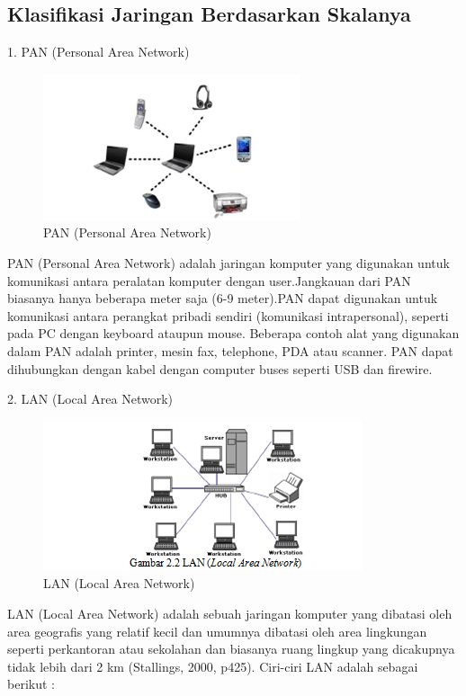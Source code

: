 \documentclass{jtetiproposalskripsi}
\begin{document}
\subsection{Klasifikasi Jaringan Berdasarkan Skalanya}
1. PAN (Personal Area Network)

\begin{figure}[ht!]
  \centering
    \includegraphics{gambar/pan}
    \caption{PAN (Personal Area Network)}
    \label{kripto}
\end{figure}
	PAN (Personal Area Network) adalah jaringan komputer yang digunakan untuk komunikasi antara peralatan komputer dengan user.Jangkauan dari PAN biasanya hanya beberapa meter saja (6-9 meter).PAN dapat digunakan untuk komunikasi antara perangkat pribadi sendiri (komunikasi intrapersonal), seperti pada PC dengan keyboard ataupun mouse. Beberapa contoh alat yang digunakan dalam PAN adalah printer, mesin fax, telephone, PDA atau scanner. PAN dapat dihubungkan dengan kabel dengan computer buses seperti USB dan firewire.

2. LAN (Local Area Network)

\begin{figure}[ht!]
  \centering
    \includegraphics{gambar/lan}
    \caption{LAN (Local Area Network)}
    \label{kripto}
\end{figure}

	LAN (Local Area Network) adalah sebuah jaringan komputer
yang dibatasi oleh area geografis yang relatif kecil dan umumnya
dibatasi oleh area lingkungan seperti perkantoran atau sekolahan dan biasanya ruang lingkup yang dicakupnya tidak lebih dari 2 km
(Stallings, 2000, p425).
Ciri-ciri LAN adalah sebagai berikut :
\end{document}
